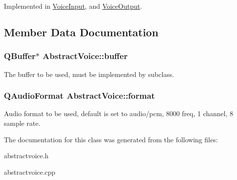 \-Implemented in \hyperlink{class_voice_input_aacdc744a4d9b156d79d05c7ea9361576}{\-Voice\-Input}, and \hyperlink{class_voice_output_ad86ffb5732b221da79f5bfba04e7a35a}{\-Voice\-Output}.



\subsection{\-Member \-Data \-Documentation}
\hypertarget{class_abstract_voice_a93b7c2b08aa97b77b8126a8dff173018}{
\subsubsection[{buffer}]{\setlength{\rightskip}{0pt plus 5cm}\-Q\-Buffer$\ast$ {\bf \-Abstract\-Voice\-::buffer}}}
\label{class_abstract_voice_a93b7c2b08aa97b77b8126a8dff173018}


\-The buffer to be used, must be implemented by subclass. 

\hypertarget{class_abstract_voice_aa8718f0af1669ef7a84347c2d9a54cf9}{
\subsubsection[{format}]{\setlength{\rightskip}{0pt plus 5cm}\-Q\-Audio\-Format {\bf \-Abstract\-Voice\-::format}}}
\label{class_abstract_voice_aa8718f0af1669ef7a84347c2d9a54cf9}


\-Audio format to be used, default is set to audio/pcm, 8000 freq, 1 channel, 8 sample rate. 



\-The documentation for this class was generated from the following files\-:\begin{DoxyCompactItemize}
\item 
abstractvoice.\-h\item 
abstractvoice.\-cpp\end{DoxyCompactItemize}
